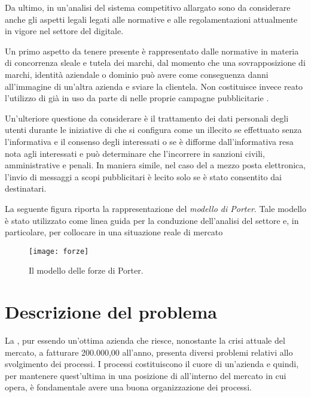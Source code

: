 Da ultimo, in un'analisi del sistema competitivo allargato sono da considerare anche gli aspetti legali legati alle normative e alle regolamentazioni attualmente in vigore nel settore del \mktg digitale.

Un primo aspetto da tenere presente è rappresentato dalle normative in materia di concorrenza sleale e tutela dei marchi, dal momento che una sovrapposizione di marchi, identità aziendale o dominio  può avere come conseguenza danni all'immagine di un'altra azienda e sviare la clientela. Non costituisce invece reato l'utilizzo di  già in uso da parte di  nelle proprie campagne pubblicitarie .

Un'ulteriore questione da considerare è il trattamento dei dati personali degli utenti durante le iniziative di \mktg che si configura come un illecito se effettuato senza l'informativa e il consenso degli interessati o se è difforme dall'informativa resa nota agli interessati e può determinare che l'incorrere in sanzioni civili, amministrative e penali. In maniera simile, nel caso del \mktg a mezzo posta elettronica, l'invio di messaggi a scopi pubblicitari è lecito solo se è stato consentito dai destinatari.

La seguente figura riporta la rappresentazione del \emph{modello di Porter}. Tale modello è stato utilizzato come linea guida per la conduzione dell'analisi del settore e, in particolare, per collocare \customer in una situazione reale di mercato

\begin{figure}[H]
  \centering
  \label{fig:forze}
  \texttt{[image: forze]}
  \caption{Il modello delle forze di Porter.}
\end{figure}

\section{Descrizione del problema}
La \customer, pur essendo un'ottima azienda che riesce, nonostante la crisi attuale del mercato, a fatturare  200.000,00 \text{\euro} all'anno, presenta diversi problemi relativi allo svolgimento dei processi.
I processi costituiscono il cuore di un'azienda e quindi, per mantenere quest'ultima in una posizione di  all'interno del mercato in cui opera, è fondamentale avere una buona organizzazione dei processi.

